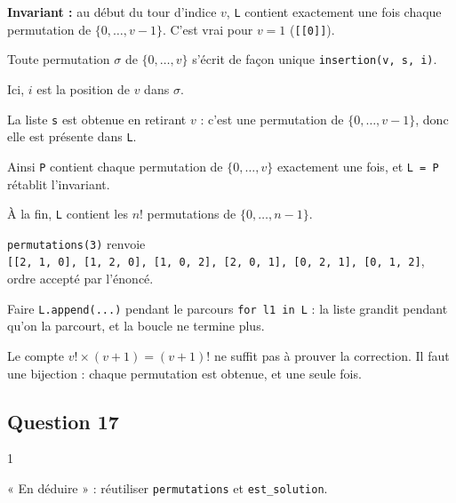 \documentclass[11pt,a4paper]{article}
\begin{document}
\textbf{Invariant :} au début du tour d'indice \(v\), \texttt{L} contient exactement une fois chaque permutation de \(\{0, \dots, v-1\}\). C'est vrai pour \(v = 1\) (\texttt{{[}{[}0{]}{]}}).

Toute permutation \(\sigma\) de \(\{0, \dots, v\}\) s'écrit de façon unique \texttt{insertion(\allowbreak{}v,\allowbreak{}\ s,\allowbreak{}\ i)\allowbreak{}}.

Ici, \(i\) est la position de \(v\) dans \(\sigma\).

La liste \texttt{s} est obtenue en retirant \(v\) : c'est une permutation de \(\{0, \dots, v-1\}\), donc elle est présente dans \texttt{L}.

Ainsi \texttt{P} contient chaque permutation de \(\{0, \dots, v\}\) exactement une fois, et \texttt{L\ =\ P} rétablit l'invariant.

À la fin, \texttt{L} contient les \(n!\) permutations de \(\{0, \dots, n-1\}\).

\texttt{permutations(3)} renvoie \texttt{{[}{[}2,\allowbreak{}\ 1,\allowbreak{}\ 0{]}\allowbreak{},\allowbreak{}\ {[}1,\allowbreak{}\ 2,\allowbreak{}\ 0{]}\allowbreak{},\allowbreak{}\ {[}1,\allowbreak{}\ 0,\allowbreak{}\ 2{]}\allowbreak{},\allowbreak{}\ {[}2,\allowbreak{}\ 0,\allowbreak{}\ 1{]}\allowbreak{},\allowbreak{}\ {[}0,\allowbreak{}\ 2,\allowbreak{}\ 1{]}\allowbreak{},\allowbreak{}\ {[}0,\allowbreak{}\ 1,\allowbreak{}\ 2{]}\allowbreak{}{]}\allowbreak{}}, ordre accepté par l'énoncé.

\begin{piege}

Faire \texttt{L.append(...)} pendant le parcours \texttt{for\ l1\ in\ L} : la liste grandit pendant qu'on la parcourt, et la boucle ne termine plus.

\end{piege}

\begin{methode}

Le compte \(v! \times (v+1) = (v+1)!\) ne suffit pas à prouver la correction. Il faut une bijection : chaque permutation est obtenue, et une seule fois.

\end{methode}

\hypertarget{question-17}{%
\subsection{Question 17}\label{question-17}}

\begin{indication}{1}

« En déduire » : réutiliser \texttt{permutations} et \texttt{est\_solution}.

\end{indication}
\end{document}
